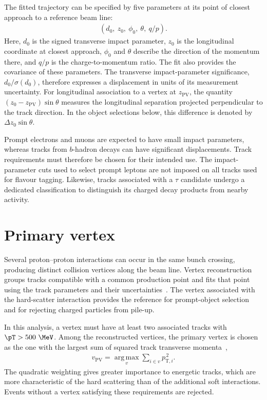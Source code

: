 The fitted trajectory can be specified by five parameters at its point of closest approach to a reference beam line:
\begin{align}
    \left(d_0,\ z_0,\ \phi_0,\ \theta,\ q/p\right).
    \label{eq:ch6_track_parameters}
\end{align}
Here, $d_0$ is the signed transverse impact parameter, $z_0$ is the longitudinal coordinate at closest approach, $\phi_0$ and $\theta$ describe the direction of the momentum there, and $q/p$ is the charge-to-momentum ratio.
The fit also provides the covariance of these parameters.
The transverse impact-parameter significance, $d_0/\sigma(d_0)$, therefore expresses a displacement in units of its measurement uncertainty.
For longitudinal association to a vertex at $z_{\mathrm{PV}}$, the quantity $(z_0-z_{\mathrm{PV}})\sin\theta$ measures the longitudinal separation projected perpendicular to the track direction.
In the object selections below, this difference is denoted by $\Delta z_0\sin\theta$.

Prompt electrons and muons are expected to have small impact parameters, whereas tracks from $b$-hadron decays can have significant displacements.
Track requirements must therefore be chosen for their intended use.
The impact-parameter cuts used to select prompt leptons are not imposed on all tracks used for flavour tagging.
Likewise, tracks associated with a $\tau$ candidate undergo a dedicated classification to distinguish its charged decay products from nearby activity.

\section{Primary vertex}
\label{sec:ch6_primary_vertex}

Several proton--proton interactions can occur in the same bunch crossing, producing distinct collision vertices along the beam line.
Vertex reconstruction groups tracks compatible with a common production point and fits that point using the track parameters and their uncertainties~\cite{ATLAS2015Vertex}.
The vertex associated with the hard-scatter interaction provides the reference for prompt-object selection and for rejecting charged particles from pile-up.

In this analysis, a vertex must have at least two associated tracks with $\pT>500~\MeV$.
Among the reconstructed vertices, the primary vertex is chosen as the one with the largest sum of squared track transverse momenta~\cite{ATLAS2026LQTauNu},
\begin{align}
    v_{\mathrm{PV}}
    = \operatorname*{arg\,max}_{v}
      \sum_{i\in v} p_{\mathrm{T},i}^{\,2}.
    \label{eq:ch6_primary_vertex}
\end{align}
The quadratic weighting gives greater importance to energetic tracks, which are more characteristic of the hard scattering than of the additional soft interactions.
Events without a vertex satisfying these requirements are rejected.

